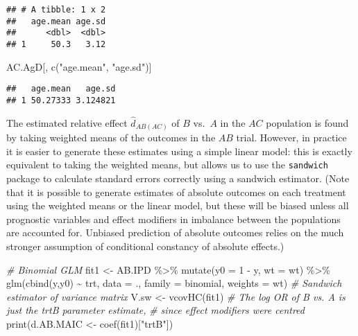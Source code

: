 \documentclass[
]{article}
\newenvironment{Shaded}{\begin{snugshade}}{\end{snugshade}}
\newcommand{\AttributeTok}[1]{\textcolor[rgb]{0.77,0.63,0.00}{#1}}
\newcommand{\CommentTok}[1]{\textcolor[rgb]{0.56,0.35,0.01}{\textit{#1}}}
\newcommand{\DecValTok}[1]{\textcolor[rgb]{0.00,0.00,0.81}{#1}}
\newcommand{\FunctionTok}[1]{\textcolor[rgb]{0.00,0.00,0.00}{#1}}
\newcommand{\NormalTok}[1]{#1}
\newcommand{\OtherTok}[1]{\textcolor[rgb]{0.56,0.35,0.01}{#1}}
\newcommand{\SpecialCharTok}[1]{\textcolor[rgb]{0.00,0.00,0.00}{#1}}
\newcommand{\StringTok}[1]{\textcolor[rgb]{0.31,0.60,0.02}{#1}}
\begin{document}
\begin{verbatim}
## # A tibble: 1 x 2
##   age.mean age.sd
##      <dbl>  <dbl>
## 1     50.3   3.12
\end{verbatim}

\begin{Shaded}
\begin{Highlighting}[]
\NormalTok{AC.AgD[, }\FunctionTok{c}\NormalTok{(}\StringTok{"age.mean"}\NormalTok{, }\StringTok{"age.sd"}\NormalTok{)]}
\end{Highlighting}
\end{Shaded}

\begin{verbatim}
##   age.mean   age.sd
## 1 50.27333 3.124821
\end{verbatim}

The estimated relative effect \(\hat{d}_{AB(AC)}\) of \(B\) vs.~\(A\) in
the \(AC\) population is found by taking weighted means of the outcomes
in the \(AB\) trial. However, in practice it is easier to generate these
estimates using a simple linear model: this is exactly equivalent to
taking the weighted means, but allows us to use the \texttt{sandwich}
package to calculate standard errors correctly using a sandwich
estimator. (Note that it is possible to generate estimates of absolute
outcomes on each treatment using the weighted means or the linear model,
but these will be biased unless all prognostic variables and effect
modifiers in imbalance between the populations are accounted for.
Unbiased prediction of absolute outcomes relies on the much stronger
assumption of conditional constancy of absolute effects.)

\begin{Shaded}
\begin{Highlighting}[]
\CommentTok{\# Binomial GLM}
\NormalTok{fit1 }\OtherTok{\textless{}{-}}
\NormalTok{AB.IPD }\SpecialCharTok{\%\textgreater{}\%} \FunctionTok{mutate}\NormalTok{(}\AttributeTok{y0 =} \DecValTok{1} \SpecialCharTok{{-}}\NormalTok{ y, }\AttributeTok{wt =}\NormalTok{ wt) }\SpecialCharTok{\%\textgreater{}\%}
\FunctionTok{glm}\NormalTok{(}\FunctionTok{cbind}\NormalTok{(y,y0) }\SpecialCharTok{\textasciitilde{}}\NormalTok{ trt, }\AttributeTok{data =}\NormalTok{ ., }\AttributeTok{family =}\NormalTok{ binomial, }\AttributeTok{weights =}\NormalTok{ wt)}
\CommentTok{\# Sandwich estimator of variance matrix}
\NormalTok{V.sw }\OtherTok{\textless{}{-}} \FunctionTok{vcovHC}\NormalTok{(fit1)}
\CommentTok{\# The log OR of B vs. A is just the trtB parameter estimate,}
\CommentTok{\# since effect modifiers were centred}
\FunctionTok{print}\NormalTok{(d.AB.MAIC }\OtherTok{\textless{}{-}} \FunctionTok{coef}\NormalTok{(fit1)[}\StringTok{"trtB"}\NormalTok{])}
\end{Highlighting}
\end{Shaded}
\end{document}
